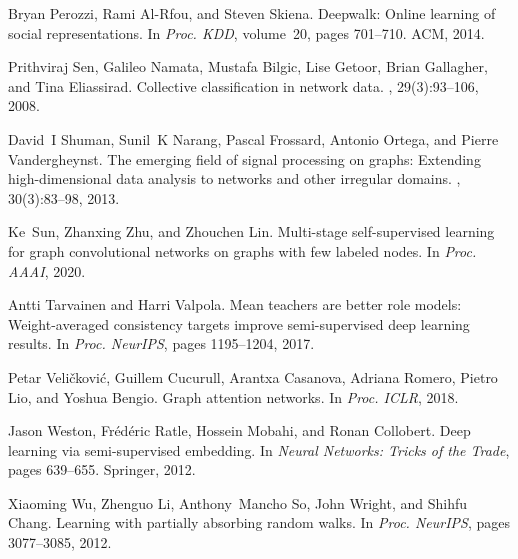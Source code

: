 \documentclass{article}
\begin{document}
\begin{thebibliography}{}
Bryan Perozzi, Rami Al-Rfou, and Steven Skiena.
\newblock Deepwalk: Online learning of social representations.
\newblock In {\em Proc. KDD}, volume~20, pages 701--710. ACM, 2014.

Prithviraj Sen, Galileo Namata, Mustafa Bilgic, Lise Getoor, Brian Gallagher,
  and Tina Eliassirad.
\newblock Collective classification in network data.
, 29(3):93--106, 2008.

David~I Shuman, Sunil~K Narang, Pascal Frossard, Antonio Ortega, and Pierre
  Vandergheynst.
\newblock The emerging field of signal processing on graphs: Extending
  high-dimensional data analysis to networks and other irregular domains.
, 30(3):83--98, 2013.

Ke~Sun, Zhanxing Zhu, and Zhouchen Lin.
\newblock Multi-stage self-supervised learning for graph convolutional networks
  on graphs with few labeled nodes.
\newblock In {\em Proc. AAAI}, 2020.

Antti Tarvainen and Harri Valpola.
\newblock Mean teachers are better role models: Weight-averaged consistency
  targets improve semi-supervised deep learning results.
\newblock In {\em Proc. NeurIPS}, pages 1195--1204, 2017.

Petar Veli{\v{c}}kovi{\'c}, Guillem Cucurull, Arantxa Casanova, Adriana Romero,
  Pietro Lio, and Yoshua Bengio.
\newblock Graph attention networks.
\newblock In {\em Proc. ICLR}, 2018.

Jason Weston, Fr{\'e}d{\'e}ric Ratle, Hossein Mobahi, and Ronan Collobert.
\newblock Deep learning via semi-supervised embedding.
\newblock In {\em Neural Networks: Tricks of the Trade}, pages 639--655.
  Springer, 2012.

Xiaoming Wu, Zhenguo Li, Anthony~Mancho So, John Wright, and Shihfu Chang.
\newblock Learning with partially absorbing random walks.
\newblock In {\em Proc. NeurIPS}, pages 3077--3085, 2012.


\end{thebibliography}
\end{document}
